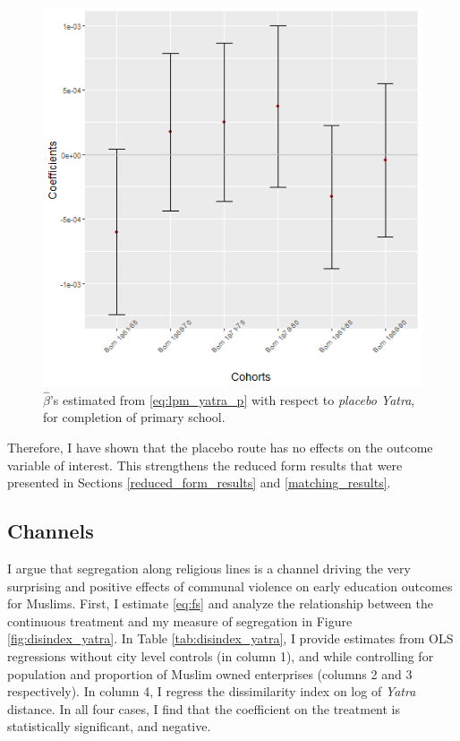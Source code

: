 \documentclass{article}
\begin{document}
\begin{figure}[H]
    \centering
    \includegraphics[scale = 0.6]{images/graph_coeff_pri_p.png}
    \caption{$\hat{\beta}$'s estimated from \eqref{eq:lpm_yatra_p} with respect to \textit{placebo Yatra}, for completion of primary school.}
    \label{fig:coeff_pri_p}
\end{figure}

Therefore, I have shown that the placebo route has no effects on the outcome variable of interest. This strengthens the reduced form results that were presented in Sections \ref{reduced_form_results} and \ref{matching_results}.

\subsection{Channels}
I argue that segregation along religious lines is a channel driving the very surprising and positive effects of communal violence on early education outcomes for Muslims. First, I estimate \eqref{eq:fs} and analyze the relationship between the continuous treatment and my measure of segregation in Figure \ref{fig:disindex_yatra}. In Table \ref{tab:disindex_yatra}, I provide estimates from OLS regressions without city level controls (in column 1), and while  controlling for population and proportion of Muslim owned enterprises (columns 2 and 3 respectively). In column 4, I regress the dissimilarity index on log of \textit{Yatra} distance. In all four cases, I find that the coefficient on the treatment is statistically significant, and negative. 
\end{document}
